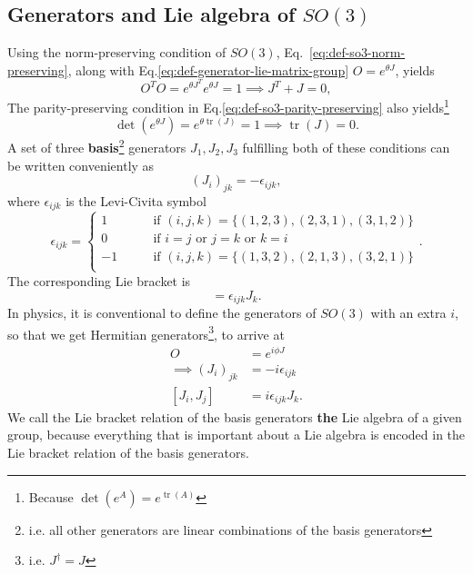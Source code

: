 \documentclass[11pt]{article}
\numberwithin{equation}{section}
\DeclareMathOperator{\tr}{tr}
\begin{document}
\subsection{Generators and Lie algebra of $SO(3)$}
Using the norm-preserving condition of $SO(3)$, Eq.~\eqref{eq:def-so3-norm-preserving}, along with Eq.\eqref{eq:def-generator-lie-matrix-group} $O = e^{\theta J}$, yields
\begin{equation}
O^TO = e^{\theta J^T} e^{\theta J} = 1 \implies J^T + J = 0,
\end{equation}
The parity-preserving condition in Eq.\eqref{eq:def-so3-parity-preserving} also yields\footnote{Because $\det(e^A)=e^{\tr(A)}$}
\begin{equation}
\det(e^{\theta J}) = e^{\theta \tr(J)} = 1 \implies \tr(J) = 0.
\end{equation}
A set of three \textbf{basis}\footnote{i.e. all other generators are linear combinations of the basis generators} generators $J_1, J_2, J_3$ fulfilling both of these conditions can be written conveniently as
\begin{equation}
(J_i)_{jk} = - \epsilon_{ijk},
\end{equation}
where $\epsilon_{ijk}$ is the Levi-Civita symbol
\begin{equation}
\epsilon_{ijk} = \begin{cases} 
1\qquad  &\text{if } (i,j,k)=\{(1,2,3), (2,3,1), (3,1,2)\}\\
0\qquad  &\text{if } i=j\text{ or } j=k\text{ or } k=i\\
-1\qquad &\text{if } (i,j,k)=\{(1,3,2), (2,1,3), (3,2,1)\}\\
\end{cases}.
\end{equation}
The corresponding Lie bracket is 
\begin{equation}
[J_i, J_j] = \epsilon_{ijk} J_k.
\end{equation}
In physics, it is conventional to define the generators of $SO(3)$ with an extra $i$, so that we get Hermitian generators\footnote{i.e. $J^\dagger = J$}, to arrive at
\begin{align}
O &= e^{i \phi J} \label{eq:def-generator-lie-matrix-group-physics} \\
\implies (J_i)_{jk} &= -i \epsilon_{ijk} \\
[J_i, J_j] &= i \epsilon_{ijk} J_k. \label{eq:lie-bracket-so3}
\end{align}
We call the Lie bracket relation of the basis generators \textbf{the} Lie algebra of a given group, because everything that is important about a Lie algebra is encoded in the Lie bracket relation of the basis generators.
\end{document}
